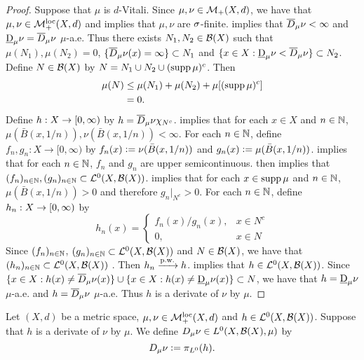 \documentclass{book}
\begin{document}
	\begin{proof}
		Suppose that $\mu$ is $d$-Vitali. 
		Since $\mu, \nu \in \mathcal{M}_+(X,d)$, we have that $\mu, \nu \in \mathcal{M}_+^{\text{loc}}(X,d)$ and  implies that $\mu, \nu$ are $\sigma$-finite.  implies that $\overline{D}_{\mu}\nu < \infty$ and $\underbar{D}_{\mu}\nu = \overline{D}_{\mu}\nu$ $\mu$-a.e. Thus there exists $N_1,N_2 \in \mathcal{B}(X)$ such that $\mu(N_1),\mu(N_2) = 0$, $\{\overline{D}_{\mu}\nu(x) = \infty\} \subset N_1$ and $\{x \in X: \underbar{D}_{\mu}\nu < \overline{D}_{\mu}\nu\} \subset N_2$. Define $N \in \mathcal{B}(X)$ by $N = N_1 \cup N_2 \cup( \operatorname{supp} \mu)^c$. Then 
		\begin{align*}
			\mu(N)
			& \leq \mu(N_1) + \mu(N_2) + \mu[(\operatorname{supp} \mu)^c] \\
			& = 0.
		\end{align*}
		Define $h:X \rightarrow [0,\infty)$ by $h = \overline{D}_{\mu} \nu \chi_{N^c}$.  implies that for each $x \in X$ and $n \in \mathbb{N}$, $\mu(\bar{B}(x, 1/n)), \nu(\bar{B}(x, 1/n)) < \infty$.   
		For each $n \in \mathbb{N}$, define $f_n, g_n: X \rightarrow [0, \infty)$ by $f_n(x) \vcentcolon= \nu(\bar{B}(x, 1/n))$ and $g_n(x) \vcentcolon= \mu(\bar{B}(x, 1/n))$.  implies that for each $n \in \mathbb{N}$, $f_n$ and $g_n$ are upper semicontinuous.  then implies that $(f_n)_{n \in \mathbb{N}}, (g_n)_{n \in \mathbb{N}} \subset \mathcal{L}^0(X, \mathcal{B}(X))$.  implies that for each $x \in \operatorname{supp} \mu$ and $n \in \mathbb{N}$, $\mu(\bar{B}(x, 1/n)) > 0$ and therefore $g_n|_{N^c} > 0$.
		For each $n \in \mathbb{N}$, define $h_n :X \rightarrow [0,\infty)$ by  
		\[
		h_n(x) = 
		\begin{cases}
			f_n(x)/g_n(x), & x \in N^c \\
			0, & x \in N
		\end{cases}
		\]
		Since $(f_n)_{n \in \mathbb{N}}$, $(g_n)_{n \in \mathbb{N}} \subset \mathcal{L}^0(X, \mathcal{B}(X))$ and $N \in \mathcal{B}(X)$, we have that $(h_n)_{n \in \mathbb{N}} \subset \mathcal{L}^0(X, \mathcal{B}(X))$ . Then $h_n \xrightarrow{\text{p.w.}} h$.  implies that $h \in \mathcal{L}^0(X, \mathcal{B}(X))$. Since $\{x \in X: h(x) \neq \overline{D}_{\mu}\nu(x)\} \cup \{x \in X: h(x) \neq \underbar{D}_{\mu}\nu(x)\} \subset N$, we have that $h = \underbar{D}_{\mu}\nu$ $\mu$-a.e. and $h = \overline{D}_{\mu}\nu$ $\mu$-a.e. Thus $h$ is a derivate of $\nu$ by $\mu$.
	\end{proof}

	\begin{defn} 
		Let $(X, d)$ be a metric space, $\mu, \nu \in \mathcal{M}_+^{\text{loc}}(X, d)$ and $h \in \mathcal{L}^0(X, \mathcal{B}(X))$. Suppose that $h$ is a derivate of $\nu$ by $\mu$. We define $D_{\mu} \nu \in L^0(X, \mathcal{B}(X), \mu)$ by $$D_{\mu} \nu \vcentcolon= \pi_{L^0}(h).$$ 
	\end{defn}
\end{document}
